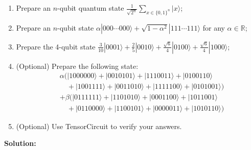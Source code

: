 \documentclass{ctexart}
\newcommand{\ket}[1]{|#1\rangle}
\begin{document}
\begin{enumerate}
    \item[(a)] Prepare an $n$-qubit quantum state $\frac{1}{\sqrt{2^n}} \sum_{x \in \{0,1\}^n} \ket{x}$;
    \item[(b)] Prepare an $n$-qubit state $\alpha\ket{000\cdots000} + \sqrt{1-\alpha^2}\ket{111\cdots111}$ for any $\alpha \in \mathbb{R}$;
    \item[(c)] Prepare the 4-qubit state $\frac{3}{10}\ket{0001} + \frac{2}{5}\ket{0010} + \frac{\sqrt{6}}{4}\ket{0100} + \frac{\sqrt{6}}{4}\ket{1000}$;
    \item[(d)] (Optional) Prepare the following state:
    \begin{align*}
        &\alpha(\ket{1000000}+\ket{0010101}+\ket{1110011}+\ket{0100110} \\
        &\quad +\ket{1001111}+\ket{0011010}+\ket{1111100}+\ket{0101001}) \\
        &+\beta(\ket{0111111}+\ket{1101010}+\ket{0001100}+\ket{1011001} \\
        &\quad +\ket{0110000}+\ket{1100101}+\ket{0000011}+\ket{1010110})
    \end{align*}
    \item[(e)] (Optional) Use TensorCircuit to verify your answers.
\end{enumerate}

\medskip
\noindent\textbf{Solution:}
\end{document}
